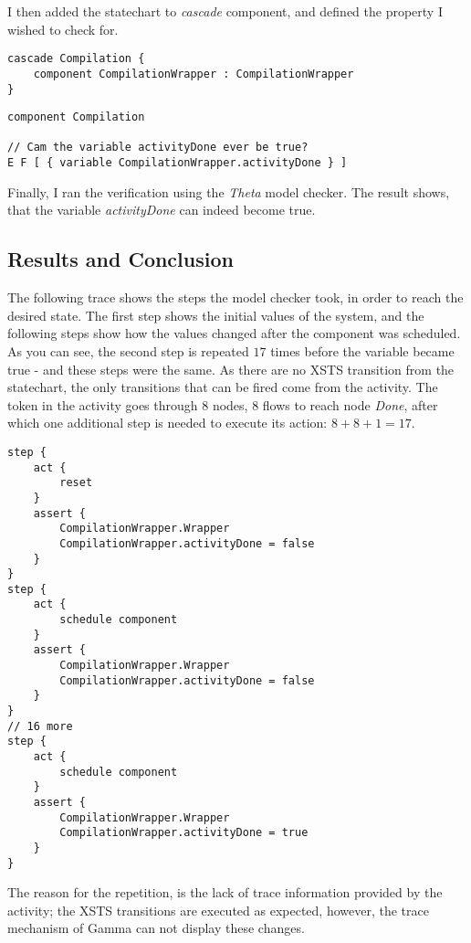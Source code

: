 I then added the statechart to \emph{cascade} component, and defined the property I wished to check for.

\begin{lstlisting}[language=statechart, linewidth=0.75\textwidth, xleftmargin=0.25\textwidth]
cascade Compilation {
	component CompilationWrapper : CompilationWrapper
}
\end{lstlisting}

\begin{lstlisting}[language=statechart, linewidth=0.75\textwidth, xleftmargin=0.25\textwidth]
component Compilation

// Cam the variable activityDone ever be true?
E F [ { variable CompilationWrapper.activityDone } ] 
\end{lstlisting}

Finally, I ran the verification using the \emph{Theta} model checker. The result shows, that the variable \emph{activityDone} can indeed become true. 

\subsection{Results and Conclusion}

The following trace shows the steps the model checker took, in order to reach the desired state. The first step shows the initial values of the system, and the following steps show how the values changed after the component was scheduled. As you can see, the second step is repeated \(17\) times before the variable became true - and these steps were the same. As there are no XSTS transition from the statechart, the only transitions that can be fired come from the activity. The token in the activity goes through 8 nodes, 8 flows to reach node \emph{Done}, after which one additional step is needed to execute its action: \( 8 + 8 + 1 = 17 \).

\begin{lstlisting}[language=statechart, linewidth=0.75\textwidth, xleftmargin=0.25\textwidth]
step {
	act {
		reset
	}
	assert {
		CompilationWrapper.Wrapper
		CompilationWrapper.activityDone = false
	}
}
step {
	act {
		schedule component
	}
	assert {
		CompilationWrapper.Wrapper
		CompilationWrapper.activityDone = false
	}
}
// 16 more
step {
	act {
		schedule component
	}
	assert {
		CompilationWrapper.Wrapper
		CompilationWrapper.activityDone = true
	}
}
\end{lstlisting}

The reason for the repetition, is the lack of trace information provided by the activity; the XSTS transitions are executed as expected, however, the trace mechanism of Gamma can not display these changes.

